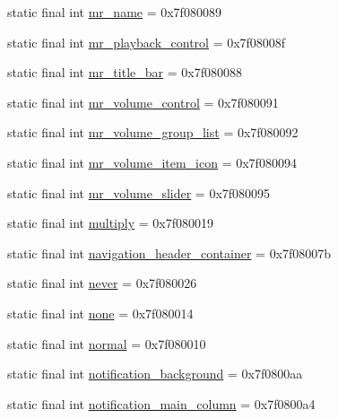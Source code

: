 \begin{CompactItemize}
\item 
static final int \hyperlink{classandroid_1_1support_1_1v4_1_1_r_1_1id_654b6f346452cf764c9fa36cfb7cf333}{mr\_\-name} = 0x7f080089
\item 
static final int \hyperlink{classandroid_1_1support_1_1v4_1_1_r_1_1id_ccd62f4f21b604da7cb7c1a85c14a2f1}{mr\_\-playback\_\-control} = 0x7f08008f
\item 
static final int \hyperlink{classandroid_1_1support_1_1v4_1_1_r_1_1id_a34f862b2c0d91e725443d3c0f913e88}{mr\_\-title\_\-bar} = 0x7f080088
\item 
static final int \hyperlink{classandroid_1_1support_1_1v4_1_1_r_1_1id_579e22c77e2822da29c6b9ff6f6d5b58}{mr\_\-volume\_\-control} = 0x7f080091
\item 
static final int \hyperlink{classandroid_1_1support_1_1v4_1_1_r_1_1id_ee5002c282734210594308ca60a87649}{mr\_\-volume\_\-group\_\-list} = 0x7f080092
\item 
static final int \hyperlink{classandroid_1_1support_1_1v4_1_1_r_1_1id_f6a6c86526d7c5f4ed2afb91899f57c5}{mr\_\-volume\_\-item\_\-icon} = 0x7f080094
\item 
static final int \hyperlink{classandroid_1_1support_1_1v4_1_1_r_1_1id_4eff820587dce947ac8ef57798bbe065}{mr\_\-volume\_\-slider} = 0x7f080095
\item 
static final int \hyperlink{classandroid_1_1support_1_1v4_1_1_r_1_1id_acad4246cbc0ae8ab4c5e5d50098396f}{multiply} = 0x7f080019
\item 
static final int \hyperlink{classandroid_1_1support_1_1v4_1_1_r_1_1id_c108538ddf8daee65c9e82687e803244}{navigation\_\-header\_\-container} = 0x7f08007b
\item 
static final int \hyperlink{classandroid_1_1support_1_1v4_1_1_r_1_1id_af332485d41e093a6e470665940f5036}{never} = 0x7f080026
\item 
static final int \hyperlink{classandroid_1_1support_1_1v4_1_1_r_1_1id_ba9e0a230be649d9c7a4f5acc6969377}{none} = 0x7f080014
\item 
static final int \hyperlink{classandroid_1_1support_1_1v4_1_1_r_1_1id_98d161f592186738c9d5d69f1b7e88ae}{normal} = 0x7f080010
\item 
static final int \hyperlink{classandroid_1_1support_1_1v4_1_1_r_1_1id_be30cc9755509441b6df3abd144e3ad5}{notification\_\-background} = 0x7f0800aa
\item 
static final int \hyperlink{classandroid_1_1support_1_1v4_1_1_r_1_1id_28b4075b9f63951ff5047d6151ab2c34}{notification\_\-main\_\-column} = 0x7f0800a4
\item 

\end{CompactItemize}
